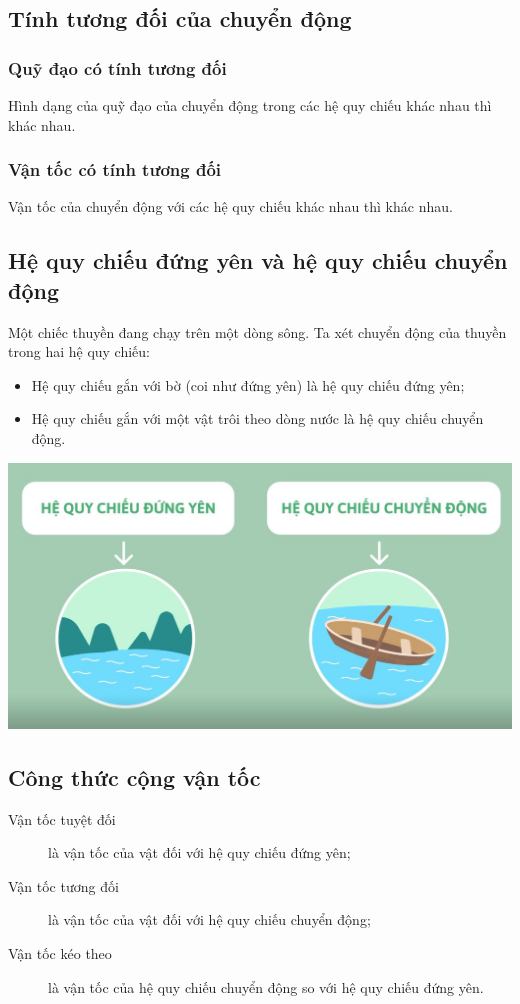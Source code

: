 \subsection{Tính tương đối của chuyển động}
\vspace*{-1em}
\subsubsection{Quỹ đạo có tính tương đối}
Hình dạng của quỹ đạo của chuyển động trong các hệ quy chiếu khác nhau thì khác nhau. 
\subsubsection{Vận tốc có tính tương đối}
Vận tốc của chuyển động với các hệ quy chiếu khác nhau thì khác nhau. 
\subsection{Hệ quy chiếu đứng yên và hệ quy chiếu chuyển động}
Một chiếc thuyền đang chạy trên một dòng sông. Ta xét chuyển động của thuyền trong hai hệ quy chiếu:
\begin{itemize}
	\item Hệ quy chiếu gắn với bờ (coi như đứng yên) là hệ quy chiếu đứng yên;
	\item Hệ quy chiếu gắn với một vật trôi theo dòng nước là hệ quy chiếu chuyển động.
\end{itemize}

\begin{center}
	\includegraphics[scale=0.3]{../figs/VN10-PH-07-L-006-2-V2-01.jpg}
\end{center}
\subsection{Công thức cộng vận tốc}
\begin{description}
	\item [Vận tốc tuyệt đối] là vận tốc của vật đối với hệ quy chiếu đứng yên;
	\item [Vận tốc tương đối] là vận tốc của vật đối với hệ quy chiếu chuyển động;
	\item [Vận tốc kéo theo] là vận tốc của hệ quy chiếu chuyển động so với hệ quy chiếu đứng yên.
\end{description}

